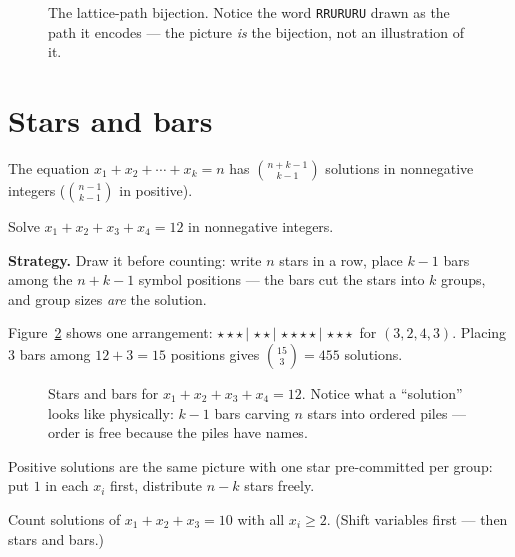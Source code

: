\begin{figure}[ht]\centering

\caption{The lattice-path bijection. Notice the word \texttt{RRURURU}
drawn as the path it encodes --- the picture \emph{is} the bijection,
not an illustration of it.}
\label{fig:lattice}
\end{figure}

\section{Stars and bars}\label{sec:stars}

\begin{theorem}
The equation $x_1 + x_2 + \cdots + x_k = n$ has $\binom{n+k-1}{k-1}$
solutions in nonnegative integers ($\binom{n-1}{k-1}$ in positive).
\end{theorem}

\begin{example}\label{ex:stars}
Solve $x_1 + x_2 + x_3 + x_4 = 12$ in nonnegative integers.
\par\smallskip
\textbf{Strategy.} Draw it before counting: write $n$ stars in a row,
place $k-1$ bars among the $n + k - 1$ symbol positions --- the bars cut
the stars into $k$ groups, and group sizes \emph{are} the solution.
\par\smallskip
\begin{solution}
Figure~\ref{fig:stars} shows one arrangement:
$\star\star\star\,\vert\,\star\star\,\vert\,\star\star\star\star\,\vert\,\star\star\star$
for $(3,2,4,3)$. Placing 3 bars among $12 + 3 = 15$ positions gives
$\binom{15}{3} = 455$ solutions.
\end{solution}
\end{example}

\begin{figure}[ht]\centering

\caption{Stars and bars for $x_1 + x_2 + x_3 + x_4 = 12$. Notice what a
``solution'' looks like physically: $k-1$ bars carving $n$ stars into
ordered piles --- order is free because the piles have names.}
\label{fig:stars}
\end{figure}

Positive solutions are the same picture with one star pre-committed per
group: put $1$ in each $x_i$ first, distribute $n - k$ stars freely.

\begin{exercise}[medium]\label{exr:stars}
Count solutions of $x_1 + x_2 + x_3 = 10$ with all $x_i \ge 2$. (Shift
variables first --- then stars and bars.)
\end{exercise}

